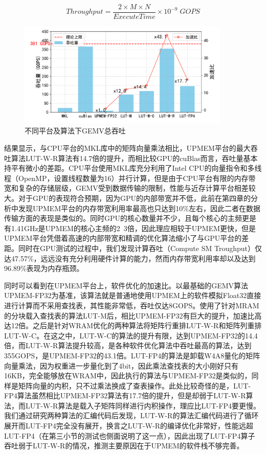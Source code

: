 \begin{equation}
    Throughput=\frac{2\times M\times N}{ExecuteTime}\times 10^{-9}\; GOPS
    \label{GOPsEqu}
\end{equation}

\begin{figure}[!htbp]
    \centering
    \includegraphics[width=0.9\textwidth]{figures/Exp1-1.pdf}
    \caption{不同平台及算法下GEMV总吞吐}
	\label{EXP1-1}
\end{figure}

结果显示，与CPU平台的MKL库中的矩阵向量乘法相比，UPMEM平台的最大吞吐算法LUT-W-R算法有14.7倍的提升，而相比较GPU的cuBlas而言，吞吐量基本持平有微小的差距。CPU平台使用MKL库充分利用了Intel CPU的向量指令和多线程（OpenMP，设置线程数量为16）并行计算，但是由于CPU平台有限的内存带宽和复杂的存储层级，GEMV受到数据传输的限制，性能与近存计算平台相差较大。对于GPU的表现符合预期，因为GPU的内部带宽并不低，此前在第四章的分析中发现UPMEM平台的内存带宽利用率最高也只达到10\%左右，因此二者在数据传输方面的表现是类似的。同时GPU的核心数量并不少，且每个核心的主频更是有1.41GHz是UPMEM的核心主频的2~3倍，因此理应相较于UPMEM更快，但是UPMEM平台凭借着高速的内部带宽和精调的优化算法缩小了与GPU平台的差距。同时在GPU测试的过程中，我们发现计算吞吐（Compute SM Troughput）仅达47.57\%，远远没有充分利用硬件计算的能力，然而内存带宽利用率却以及达到96.89\%表现为内存瓶颈。

同时可以看到在UPMEM平台上，软件优化的加速比。以最基础的GEMV算法UPMEM-FP32为基准，该算法就是普通地使用UPMEM上的软件模拟Float32直接进行计算而不采用查找表，其性能非常低，吞吐仅达8GOPS。使用了针对MRAM的分块载入查找表的算法LUT-M后，相比UPMEM-FP32有巨大的提升，加速比高达12倍。之后是针对WRAM优化的两种算法将矩阵行重排LUT-W-R和矩阵列重排LUT-W-C。在这之中，LUT-W-C的算法的提升有限，达到UPMEM-FP32的14.4倍，而LUT-W-R算法提升较高，是各种软件优化算法中吞吐最高的算法，达到355GOPS，是UPMEM-FP32的43.1倍。LUT-FP4的算法是卸载W4A8量化的矩阵向量乘法，因为权重进一步量化到了4bit，因此乘法查找表的大小刚好只有16KB，完全能够放在WRAM中，因此执行的算法与UPMEM-FP32是类似的，同样是矩阵向量的内积，只不过乘法换成了查表操作。此处比较奇怪的是，LUT-FP4算法虽然相比UPMEM-FP32算法有17.7倍的提升，但是却弱于LUT-W-R算法，而LUT-W-R算法是载入子矩阵同样进行内积操作，理应比LUT-FP4要更慢。我们通过研究两种算法的汇编代码后发现，LUT-W-R的算法汇编代码进行了循环展开而LUT-FP4完全没有展开，换言之LUT-W-R的编译优化非常好，性能远超LUT-FP4（在第三小节的测试也侧面说明了这一点），因此出现了LUT-FP4算子吞吐弱于LUT-W-R的情况，推测主要原因在于UPMEM的软件栈不够完善。

